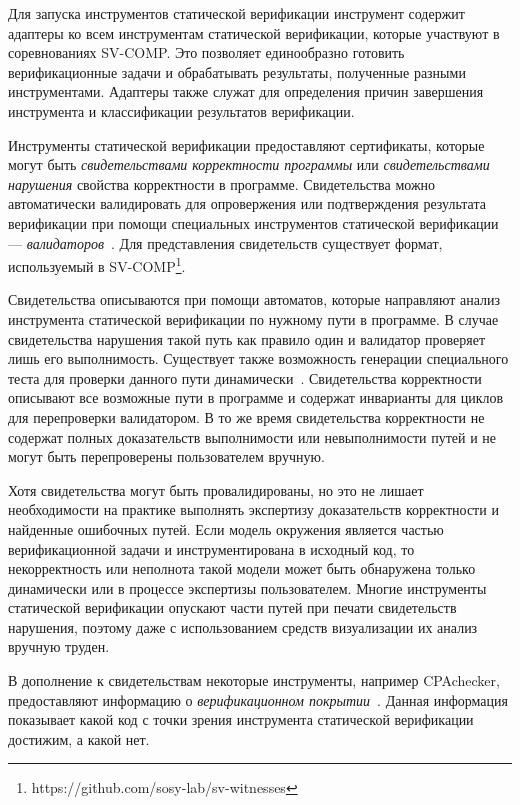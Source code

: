 \documentclass[%
candidate,     %
href,        %
colorlinks,  %
]{disser}
\begin{document}
Для запуска инструментов статической верификации инструмент содержит адаптеры ко всем инструментам статической верификации, которые участвуют в соревнованиях \mbox{SV-COMP}. 
Это позволяет единообразно готовить верификационные задачи и обрабатывать результаты, полученные разными инструментами. 
Адаптеры также служат для определения причин завершения инструмента и классификации результатов верификации.

Инструменты статической верификации предоставляют сертификаты, которые могут быть \textit{свидетельствами корректности программы} или \textit{свидетельствами нарушения} свойства корректности в программе.
Свидетельства можно автоматически валидировать для опровержения или подтверждения результата верификации при помощи специальных инструментов статической верификации --- \textit{валидаторов}~\cite{Beyer:2015:WVS,Beyer:2016:CWE}.
Для представления свидетельств существует формат, используемый в \mbox{SV-COMP}\footnote{https://github.com/sosy-lab/sv-witnesses}.

Свидетельства описываются при помощи автоматов, которые направляют анализ инструмента статической верификации по нужному пути в программе.
В случае свидетельства нарушения такой путь как правило один и валидатор проверяет лишь его выполнимость.
Существует также возможность генерации специального теста для проверки данного пути динамически~\cite{Beyer2018TestsFW, Beyer:2004:GTC}.
Свидетельства корректности описывают все возможные пути в программе и содержат инварианты для циклов для перепроверки валидатором.
В то же время свидетельства корректности не содержат полных доказательств выполнимости или невыполнимости путей и не могут быть перепроверены пользователем вручную.

Хотя свидетельства могут быть провалидированы, но это не лишает необходимости на практике выполнять экспертизу доказательств корректности и найденные ошибочных путей.
Если модель окружения является частью верификационной задачи и инструментирована в исходный код, то некорректность или неполнота такой модели может быть обнаружена только динамически или в процессе экспертизы пользователем.
Многие инструменты статической верификации опускают части путей при печати свидетельств нарушения, поэтому даже с использованием средств визуализации их анализ вручную труден.

В дополнение к свидетельствам некоторые инструменты, например CPAchecker, предоставляют информацию о \textit{верификационном покрытии}~\cite{verificationcov}.
Данная информация показывает какой код с точки зрения инструмента статической верификации достижим, а какой нет.
\end{document}
